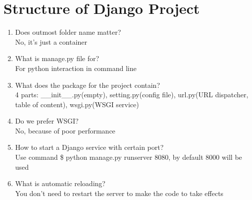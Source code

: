 \documentclass[10pt,a4paper,oneside]{article}
\begin{document}
\section{Structure of Django Project}
\begin{enumerate}[1.]
\item Does outmost folder name matter?\\
No, it’s just a container
\item What is manage.py file for?\\
For python interaction in command line
\item What does the package for the project contain?\\
4 parts: \_\_init\_\_.py(empty), setting.py(config file), url.py(URL dispatcher, table of content), wsgi.py(WSGI service)
\item Do we prefer WSGI?\\
No, because of poor performance
\item How to start a Django service with certain port?\\
Use command \$ python manage.py runserver 8080, by default 8000 will be used
\item What is automatic reloading?\\
You don't need to restart the server to make the code to take effects
\end{enumerate}
\end{document}
